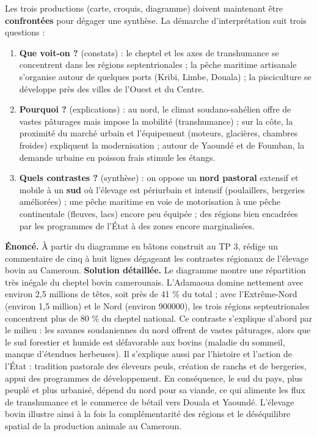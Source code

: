 \documentclass[11pt]{article}
\begin{document}
Les trois productions (carte, croquis, diagramme) doivent maintenant être \textbf{confrontées} pour dégager une synthèse. La démarche d'interprétation suit trois questions :

\begin{enumerate}
\item \textbf{Que voit-on ?} (constats) : le cheptel et les axes de transhumance se concentrent dans les régions septentrionales ; la pêche maritime artisanale s'organise autour de quelques ports (Kribi, Limbe, Douala) ; la pisciculture se développe près des villes de l'Ouest et du Centre.
\item \textbf{Pourquoi ?} (explications) : au nord, le climat soudano-sahélien offre de vastes pâturages mais impose la mobilité (transhumance) ; sur la côte, la proximité du marché urbain et l'équipement (moteurs, glacières, chambres froides) expliquent la modernisation ; autour de Yaoundé et de Foumban, la demande urbaine en poisson frais stimule les étangs.
\item \textbf{Quels contrastes ?} (synthèse) : on oppose un \textbf{nord pastoral} extensif et mobile à un \textbf{sud} où l'élevage est périurbain et intensif (poulaillers, bergeries améliorées) ; une pêche maritime en voie de motorisation à une pêche continentale (fleuves, lacs) encore peu équipée ; des régions bien encadrées par les programmes de l'État à des zones encore marginalisées.
\end{enumerate}

\begin{exoresolu}
\textbf{Énoncé.} À partir du diagramme en bâtons construit au TP 3, rédige un commentaire de cinq à huit lignes dégageant les contrastes régionaux de l'élevage bovin au Cameroun.
\tcblower
\textbf{Solution détaillée.} Le diagramme montre une répartition très inégale du cheptel bovin camerounais. L'Adamaoua domine nettement avec environ 2,5 millions de têtes, soit près de 41 \% du total ; avec l'Extrême-Nord (environ 1,5 million) et le Nord (environ \num{900000}), les trois régions septentrionales concentrent plus de 80 \% du cheptel national. Ce contraste s'explique d'abord par le milieu : les savanes soudaniennes du nord offrent de vastes pâturages, alors que le sud forestier et humide est défavorable aux bovins (maladie du sommeil, manque d'étendues herbeuses). Il s'explique aussi par l'histoire et l'action de l'État : tradition pastorale des éleveurs peuls, création de ranchs et de bergeries, appui des programmes de développement. En conséquence, le sud du pays, plus peuplé et plus urbanisé, dépend du nord pour sa viande, ce qui alimente les flux de transhumance et le commerce de bétail vers Douala et Yaoundé. L'élevage bovin illustre ainsi à la fois la complémentarité des régions et le déséquilibre spatial de la production animale au Cameroun.
\end{exoresolu}
\end{document}
